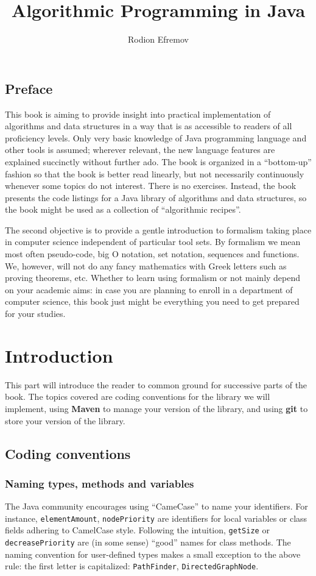 \documentclass[oneside]{book}
\title{Algorithmic Programming in Java}
\author{Rodion Efremov}
\begin{document}
\maketitle

\chapter*{Preface}
This book is aiming to provide insight into practical implementation of algorithms and data structures in a way that is as accessible to readers of all proficiency levels. Only very basic knowledge of Java programming language and other tools is assumed; wherever relevant, the new language features are explained succinctly without further ado. The book is organized in a ``bottom-up'' fashion so that the book is better read linearly, but not necessarily continuously whenever some topics do not interest. There is no exercises. Instead, the book presents the code listings for a Java library of algorithms and data structures, so the book might be used as a collection of ``algorithmic recipes''. 

The second objective is to provide a gentle introduction to formalism taking place in computer science independent of particular tool sets. By formalism we mean most often pseudo-code, big O notation, set notation, sequences and functions. We, however, will not do any fancy mathematics with Greek letters such as proving theorems, etc. Whether to learn using formalism or not mainly depend on your academic aims: in case you are planning to enroll in a department of computer science, this book just might be everything you need to get prepared for your studies.

\makeatletter\@openrightfalse
\part{Introduction}
This part will introduce the reader to common ground for successive parts of the book. The topics covered are coding conventions for the library we will implement, using \textbf{Maven} to manage your version of the library, and using \textbf{git} to store your version of the library.

\chapter{Coding conventions}
\@openrighttrue\makeatother
\section{Naming types, methods and variables}
The Java community encourages using ``CameCase'' to name your identifiers. For instance, \texttt{elementAmount}, \texttt{nodePriority} are identifiers for local variables or class fields adhering to CamelCase style. Following the intuition, \texttt{getSize} or \texttt{decreasePriority} are (in some sense) ``good'' names for class methods. The naming convention for user-defined types makes a small exception to the above rule: the first letter is capitalized: \texttt{PathFinder}, \texttt{DirectedGraphNode}.
\end{document}
